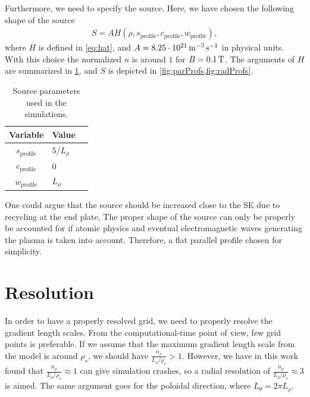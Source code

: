 Furthermore, we need to specify the source.
Here, we have chosen the following shape of the source
%
\begin{align*}
    S = AH(\rho,s_{\text{profile}},c_{\text{profile}},w_{\text{profile}}),
\end{align*}
%
where $H$ is defined in \cref{eq:hat}, and $A=8.25\cdot10^{21} \, \text{m}^{-3}\, \text{s}^{-1}$ in physical units.
With this choice the normalized $n$ is around $1$ for $B=0.1\, \text{T}$.
The arguments of $H$ are summarized in \cref{tb:source}, and $S$ is depicted in \cref{fig:parProfs,fig:radProfs}.
%
\begin{table}[!htb]
      \centering
            \begin{tabular}{c|ll}
            \hline\hline
            Variable & Value \\
            \hline
            $s_{\text{profile}}$ & $5/L_\rho$\\
            $c_{\text{profile}}$ & $0$       \\
            $w_{\text{profile}}$ & $L_\rho$  \\
            \hline\hline
            \end{tabular}
            \caption{Source parameters used in the simulations.}
            \label{tb:source}
\end{table}

One could argue that the source should be increased close to the SE due to recycling at the end plate,
The proper shape of the source can only be properly be accounted for if atomic physics and eventual electromagnetic waves generating the plasma is taken into account.
Therefore, a flat parallel profile chosen for simplicity.

\section{Resolution}
\label{sec:resolution}
%
In order to have a properly resolved grid, we need to properly resolve the gradient length scales.
From the computational-time point of view, few grid points is preferable.
If we assume that the maximum gradient length scale from the model is around $\rho_s$, we should have $\frac{n_\rho}{L_\rho/\rho_s}>1$.
However, we have in this work found that $\frac{n_\rho}{L_\rho/\rho_s}\approx1$ can give simulation crashes, so a radial resolution of $\frac{n_\rho}{L_\rho/\rho_s}\approx3$ is aimed.
The same argument goes for the poloidal direction, where $L_\theta=2\pi L_\rho$.


